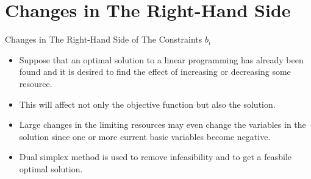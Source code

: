 \section{Changes in The Right-Hand Side}
\label{sec:changes-right-hand-side}

\begin{frame}{Changes in The Right-Hand Side of The Constraints $b_i$}{}
  \begin{itemize} \justifying \parskip3mm
  \item Suppose that an optimal solution to a linear programming has already been found and it is desired to find the effect of increasing or decreasing some resource.
  \item This will affect not only the objective function but also the solution.
  \item Large changes in the limiting resources \alert{may even change the variables in the solution since one or more current basic variables become negative}.
  \item Dual simplex method is used to remove infeasibility and to get a feasbile optimal solution.
  \end{itemize}
  
\end{frame}

